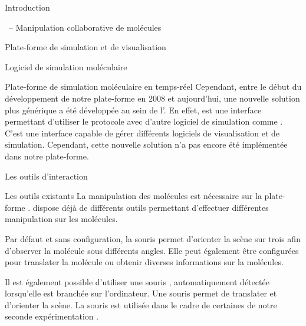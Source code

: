 \documentclass[myfrancais]{mythesis}
\begin{document}
\begin{mypart}{Introduction}
\begin{mychapter}{\myShaddock\ -- Manipulation collaborative de molécules}
\begin{mysection}{Plate-forme de simulation et de visualisation}
\begin{mysubsection}{Logiciel de simulation moléculaire}
\begin{mysubsubsection}{Plate-forme de simulation moléculaire en temps-réel}
						Cependant, entre le début du développement de notre plate-forme en 2008 et aujourd'hui, une nouvelle solution plus générique a été développée au sein de l'.
						En effet, \myMDDriver {} est une interface permettant d'utiliser le protocole  avec d'autre logiciel de simulation comme \myGromacs.
						C'est une interface capable de gérer différents logiciels de visualisation et de simulation.
						Cependant, cette nouvelle solution n'a pas encore été implémentée dans notre plate-forme.
					\end{mysubsubsection}
				\end{mysubsection}
			\end{mysection}
			\begin{mysection}{Les outils d'interaction}
				\begin{mysubsection}{Les outils existants}
					La manipulation des molécules est nécessaire sur la plate-forme \myShaddock.
					 dispose déjà de différents outils permettant d'effectuer différentes manipulation sur les molécules.

					Par défaut et sans configuration, la souris permet d'orienter la scène sur trois  afin d'observer la molécule sous différents angles.
					Elle peut également être configurées pour translater la molécule ou obtenir diverses informations sur la molécules.

					Il est également possible d'utiliser une souris \myThreeD, automatiquement détectée lorsqu'elle est branchée sur l'ordinateur.
					Une souris \myThreeD permet de translater et d'orienter la scène.
					La souris \myThreeD \mySpaceNavigator est utilisée dans le cadre de certaines de notre seconde expérimentation .


\end{mysubsection}
\end{mysection}
\end{mychapter}
\end{mypart}
\end{document}
